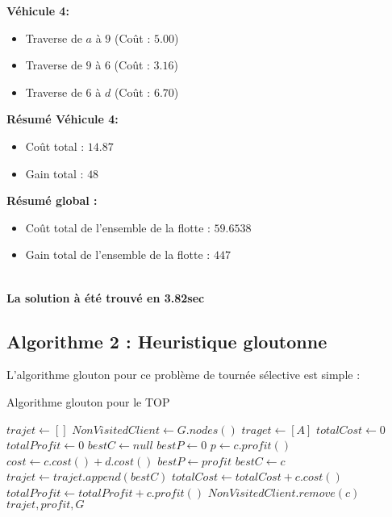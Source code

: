 \documentclass[a4paper, 12pt, DIV=12]{scrartcl}
\begin{document}
\textbf{Véhicule 4:}
\begin{itemize}
    \item Traverse de $a$ à $9$ (Coût : $5.00$)
    \item Traverse de $9$ à $6$ (Coût : $3.16$)
    \item Traverse de $6$ à $d$ (Coût : $6.70$)
\end{itemize}
\textbf{Résumé Véhicule 4:}
\begin{itemize}
    \item Coût total : $14.87$
    \item Gain total : $48$
\end{itemize}

\textbf{Résumé global :}
\begin{itemize}
    \item Coût total de l'ensemble de la flotte  : $59.6538$
    \item Gain total de l'ensemble de la flotte : $447$
\end{itemize}\\[10pt]
\textbf{La solution à été trouvé en 3.82sec}
\newpage
\subsection{Algorithme 2 : Heuristique gloutonne}
L'algorithme glouton pour ce problème de tournée sélective est simple :
\begin{algorithm}
\caption{Algorithme glouton pour le TOP}
\begin{algorithmic}[1]
    \State $trajet \gets []$
    \State $NonVisitedClient \gets G.nodes()$
       \State $traget \gets [A]$
       \State $totalCost \gets 0$
       \State $totalProfit \gets 0$
                \State $bestC \gets null$
                \State $bestP \gets 0$
                        \State $p \gets c.profit()$ 
                        \State $cost \gets c.cost() +d.cost()$
                                \State $bestP \gets profit$
                                \State $bestC \gets c$
                            \EndIf
                        \EndIf
                    \EndIf
                \EndFor
                    \State $trajet \gets trajet.append(bestC)$
                    \State $totalCost \gets totalCost +c.cost()$
                    \State $totalProfit \gets totalProfit +c.profit()$
                    \State $NonVisitedClient.remove(c)$
                \EndIf
            \EndWhile                
        \EndFor
    \State \Return $trajet, profit, G$
\EndProcedure
\end{algorithmic}
\end{algorithm}
\end{document}
